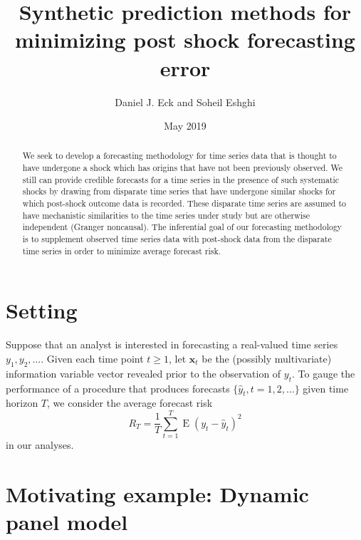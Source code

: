 \documentclass[11pt]{article}
\title{Synthetic prediction methods for minimizing post shock forecasting error}
\author{Daniel J. Eck and Soheil Eshghi}
\date{May 2019}
\newcommand{\x}{\textbf{x}}
\DeclareMathOperator{\E}{E}
\begin{document}
\maketitle
\begin{abstract}
    We seek to develop a forecasting methodology for time series data that is 
    thought to have undergone a shock which has origins that have not been 
    previously observed.  We still can provide credible forecasts for a time 
    series in the presence of such systematic shocks by drawing from disparate 
    time series that have undergone similar shocks for which post-shock 
    outcome data is recorded.  These disparate time series are assumed to have 
    mechanistic similarities to the time series under study but are otherwise 
    independent (Granger noncausal).  The inferential goal of our forecasting 
    methodology is to supplement observed time series data with post-shock 
    data from the disparate time series in order to minimize average forecast 
    risk. 
\end{abstract}


\section{Setting}
Suppose that an analyst is interested in forecasting a real-valued time series 
$y_1, y_2, \ldots$.  Given each time point $t \geq 1$, let $\x_t$ be the 
(possibly multivariate) information variable vector revealed prior to the 
observation of $y_t$.  To gauge the performance of a procedure that produces forecasts 
$\{\hat y_t, t= 1,2,\ldots\}$ given time horizon $T$, we consider the average 
forecast risk
$$
  R_T = \frac{1}{T}\sum_{t=1}^T\E(y_t - \hat y_t)^2
$$
in our analyses.


\section{Motivating example: Dynamic panel model}
\label{sec:dpm}
\end{document}
